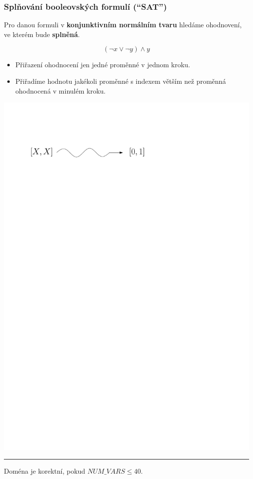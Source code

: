 \documentclass[usenames,dvipsnames,9pt]{beamer}
\begin{document}
\begin{frame}
  \frametitle{Splňování booleovských formulí (``SAT'')}
  
  Pro danou formuli v {\bf konjunktivním normálním tvaru} hledáme ohodnovení, ve kterém bude {\bf splněná}.
  
  \begin{equation*}
  (\neg x\vee \neg y)\wedge y
  \end{equation*}
  
  \begin{itemize}
  \item Přiřazení ohodnocení jen jedné proměnné v jednom kroku.
  \item Přiřadíme hodnotu jakékoli proměnné s indexem větším než proměnná ohodnocená v minulém kroku.
  \end{itemize}
  
  \vspace{1em}

\begin{center}
\includegraphics[width=0.5\linewidth]{08/figs/sat.pdf}
\end{center}

\vspace{1em}\hrule\vspace{1em}

\faWarning\hspace{3pt} Doména je korektní, pokud $NUM\_VARS \leq 40$.
\end{frame}
\end{document}
